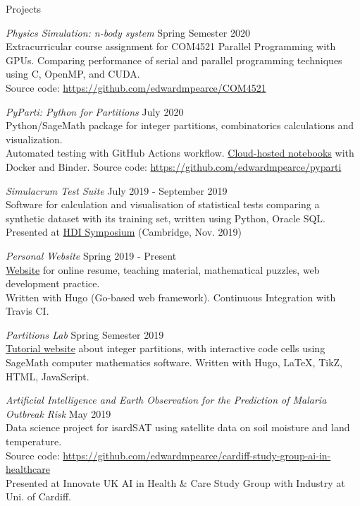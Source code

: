 \documentclass{resume} %
\begin{document}

\begin{rSection}{Projects}

{\em Physics Simulation: n-body system} \hfill Spring Semester 2020 \\
Extracurricular course assignment for COM4521 Parallel Programming with GPUs. Comparing performance of serial and parallel programming techniques using C, OpenMP, and CUDA.\\
Source code: \href{https://github.com/edwardmpearce/COM4521}{https://github.com/edwardmpearce/COM4521}

{\em PyParti: Python for Partitions} \hfill July 2020 \\
Python/SageMath package for integer partitions, combinatorics calculations and visualization. \\
Automated testing with GitHub Actions workflow.
\href{https://mybinder.org/v2/gh/edwardmpearce/pyparti/master}{Cloud-hosted notebooks} with Docker and Binder.
Source code: \href{https://github.com/edwardmpearce/pyparti}{https://github.com/edwardmpearce/pyparti}

{\em Simulacrum Test Suite} \hfill July 2019 - September 2019 \\
Software for calculation and visualisation of statistical tests comparing a synthetic dataset with its training set, written using Python, Oracle SQL.
Presented at \href{https://healthdatainsight.org.uk/hdi-symposium-2019/}{HDI Symposium} (Cambridge, Nov. 2019)

{\em Personal Website} \hfill Spring 2019 - Present \\
\href{https://edwardmpearce.github.io/}{Website} for online resume, teaching material, mathematical puzzles, web development practice.\\
Written with Hugo (Go-based web framework). Continuous Integration with Travis CI.

{\em Partitions Lab} \hfill Spring Semester 2019 \\
\href{https://edwardmpearce.github.io/tutorial-partitions/}{Tutorial website} about integer partitions, with interactive code cells using SageMath computer mathematics software. 
Written with Hugo, LaTeX, TikZ, HTML, JavaScript.

{\em Artificial Intelligence and Earth Observation for the Prediction of Malaria Outbreak Risk} \hfill May 2019 \\
Data science project for isardSAT using satellite data on soil moisture and land temperature. \\
Source code: \href{https://github.com/edwardmpearce/cardiff-study-group-ai-in-healthcare}{https://github.com/edwardmpearce/cardiff-study-group-ai-in-healthcare}\\
Presented at Innovate UK AI in Health \& Care Study Group with Industry at Uni. of Cardiff.


\end{rSection}
\end{document}

